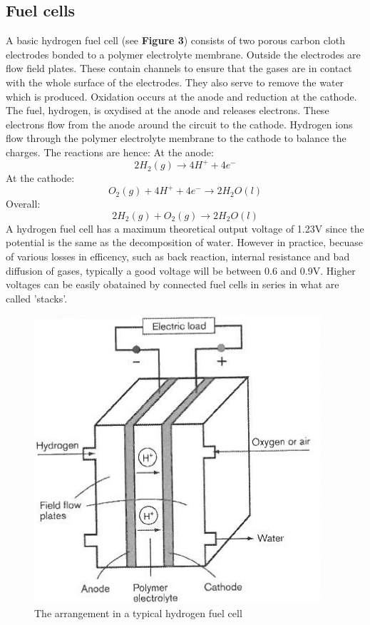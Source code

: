 \documentclass{article}
\begin{document}
    \subsection{Fuel cells}
    A basic hydrogen fuel cell (see \textbf{Figure 3}) consists of two porous carbon cloth electrodes bonded to a polymer electrolyte membrane. 
    Outside the electrodes are flow field plates. These contain channels to ensure that the gases are in contact with the whole surface 
    of the electrodes. They also serve to remove the water which is produced.
    \newline Oxidation occurs at the anode and reduction at the cathode. The fuel, hydrogen, is oxydised at the anode 
    and releases electrons. These electrons flow from the anode around the circuit to the cathode. Hydrogen ions flow through 
    the polymer electrolyte membrane to the cathode to balance the charges. \cite{ETH}
    \newline The reactions are hence:
    \newline At the anode: \cite{ETH}
    \begin{equation}
        2H_2(g) \rightarrow 4H^+ + 4e^-
    \end{equation}
    At the cathode: \cite{ETH}
    \begin{equation}
        O_2(g) + 4H^+ + 4e^- \rightarrow 2H_2O(l)
    \end{equation}
    Overall: \cite{ETH}
    \begin{equation}
        2H_2(g) + O_2(g) \rightarrow 2H_2O(l)
    \end{equation}
    A hydrogen fuel cell has a maximum theoretical output voltage of 1.23V since the potential is the same as the decomposition of water. However 
    in practice, becuase of various losses in efficency, such as back reaction, internal resistance and bad diffusion of gases, typically a good voltage 
    will be between 0.6 and 0.9V.
    \newline Higher voltages can be easily obatained by connected fuel cells in series in what are called 'stacks'.
    \begin{figure}
        \centering
        \includegraphics[scale=0.4]{./fuel.png}
        \caption{The arrangement in a typical hydrogen fuel cell \cite{ETH}}
    \end{figure}
\end{document}
